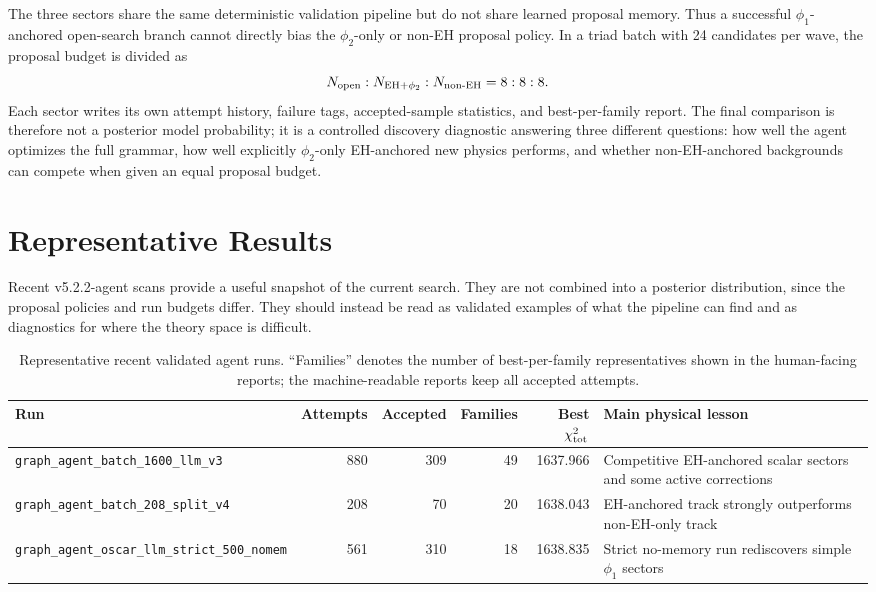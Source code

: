 \documentclass[aps,prd,twocolumn,superscriptaddress,nofootinbib,longbibliography]{revtex4-2}
\newcommand{\chiT}{\chi^2_{\rm tot}}
\begin{document}
The three sectors share the same deterministic validation pipeline but do not share learned proposal memory.  Thus a successful $\phi_1$-anchored open-search branch cannot directly bias the $\phi_2$-only or non-EH proposal policy.  In a triad batch with 24 candidates per wave, the proposal budget is divided as
\begin{equation}
N_{\rm open}:N_{\rm EH+\phi_2}:N_{\rm non\text{-}EH}=8:8:8 .
\label{eq:triad-budget}
\end{equation}
Each sector writes its own attempt history, failure tags, accepted-sample statistics, and best-per-family report.  The final comparison is therefore not a posterior model probability; it is a controlled discovery diagnostic answering three different questions: how well the agent optimizes the full grammar, how well explicitly $\phi_2$-only EH-anchored new physics performs, and whether non-EH-anchored backgrounds can compete when given an equal proposal budget.

\section{Representative Results}
\label{sec:results}

Recent v5.2.2-agent scans provide a useful snapshot of the current search.  They are not combined into a posterior distribution, since the proposal policies and run budgets differ.  They should instead be read as validated examples of what the pipeline can find and as diagnostics for where the theory space is difficult.

\begin{table}[t]
\centering
\begin{ruledtabular}
\begin{tabular}{lrrrrl}
Run & Attempts & Accepted & Families & Best $\chiT$ & Main physical lesson \\
\hline
\texttt{graph\_agent\_batch\_1600\_llm\_v3} & 880 & 309 & 49 & 1637.966 & Competitive EH-anchored scalar sectors and some active corrections \\
\texttt{graph\_agent\_batch\_208\_split\_v4} & 208 & 70 & 20 & 1638.043 & EH-anchored track strongly outperforms non-EH-only track \\
\texttt{graph\_agent\_oscar\_llm\_strict\_500\_nomem} & 561 & 310 & 18 & 1638.835 & Strict no-memory run rediscovers simple $\phi_1$ sectors \\
\end{tabular}
\end{ruledtabular}
\caption{Representative recent validated agent runs.  ``Families'' denotes the number of best-per-family representatives shown in the human-facing reports; the machine-readable reports keep all accepted attempts.}
\label{tab:results}
\end{table}
\end{document}
